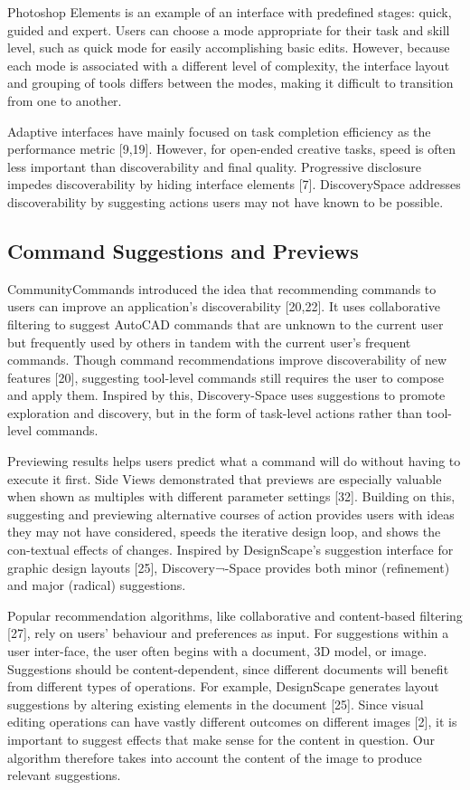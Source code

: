 Photoshop Elements is an example of an interface with predefined stages: quick, guided and expert. Users can choose a mode appropriate for their task and skill level, such as quick mode for easily accomplishing basic edits. However, because each mode is associated with a different level of complexity, the interface layout and grouping of tools differs between the modes, making it difficult to transition from one to another.

Adaptive interfaces have mainly focused on task completion efficiency as the performance metric [9,19]. However, for open-ended creative tasks, speed is often less important than discoverability and final quality. Progressive disclosure impedes discoverability by hiding interface elements [7]. Discovery\-Space addresses discoverability by suggesting actions users may not have known to be possible.

\subsection{Command Suggestions and Previews}
CommunityCommands introduced the idea that recommending commands to users can improve an application's discoverability [20,22]. It uses collaborative filtering to suggest AutoCAD commands that are unknown to the current user but frequently used by others in tandem with the current user's frequent commands. Though command recommendations improve discoverability of new features [20], suggesting tool-level commands still requires the user to compose and apply them. Inspired by this, Discovery-Space uses suggestions to promote exploration and discovery, but in the form of task-level actions rather than tool-level commands. 

Previewing results helps users predict what a command will do without having to execute it first. Side Views demonstrated that previews are especially valuable when shown as multiples with different parameter settings [32]. Building on this, suggesting and previewing alternative courses of action provides users with ideas they may not have considered, speeds the iterative design loop, and shows the con-textual effects of changes. Inspired by DesignScape's suggestion interface for graphic design layouts [25], Discovery¬-Space provides both minor (refinement) and major (radical) suggestions.

Popular recommendation algorithms, like collaborative and content-based filtering [27], rely on users' behaviour and preferences as input. For suggestions within a user inter-face, the user often begins with a document, 3D model, or image. Suggestions should be content-dependent, since different documents will benefit from different types of operations. For example, DesignScape generates layout suggestions by altering existing elements in the document [25]. Since visual editing operations can have vastly different outcomes on different images [2], it is important to suggest effects that make sense for the content in question. Our algorithm therefore takes into account the content of the image to produce relevant suggestions.

